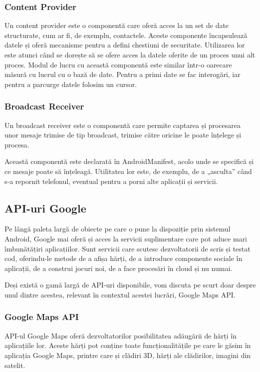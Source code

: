 \documentclass[12pt,a4paper]{article}
\begin{document}
\subsubsection{Content Provider}
Un content provider este o componentă care oferă acces la un set de date structurate, cum ar fi, de exemplu, contactele. Aceste componente încapsulează datele și oferă mecanisme pentru a defini chestiuni de securitate. Utilizarea lor este atunci când se dorește să se ofere acces la datele oferite de un proces unui alt proces.
Modul de lucru cu această componentă este similar într-o oarecare măsură cu lucrul cu o bază de date. Pentru a primi date se fac interogări, iar pentru a parcurge datele folosim un cursor.

\subsubsection{Broadcast Receiver}
Un broadcast receiver este o componentă care permite captarea și procesarea unor mesaje trimise de tip broadcast, trimise către oricine le poate înțelege și procesa.

Această componentă este declarată în AndroidManifest, acolo unde se specifică și ce mesaje poate să înțeleagă. Utilitatea lor este, de exemplu, de a „asculta” când s-a repornit telefonul, eventual pentru a porni alte aplicații și servicii.


\subsection{API-uri Google}
Pe lângă paleta largă de obiecte pe care o pune la dispoziție prin sistemul Android, Google mai oferă și acces la servicii suplimentare care pot aduce mari îmbunătățiri aplicațiilor. Sunt servicii care scutesc dezvoltatorii de scris și testat cod, oferindu-le metode de a afișa hărți, de a introduce componente sociale în aplicații, de a construi jocuri noi, de a face procesări în cloud și nu numai.

Deși există o gamă largă de API-uri disponibile, vom discuta pe scurt doar despre unul dintre acestea, relevant în contextul acestei lucrări, Google Maps API.

\subsubsection{Google Maps API}
API-ul Google Maps oferă dezvoltatorilor posibilitatea adăugării de hărți în aplicațiile lor. Aceste hărți pot conține toate funcționalitățile pe care le găsim în aplicația Google Maps, printre care și clădiri 3D, hărți ale clădirilor, imagini din satelit.
\end{document}
